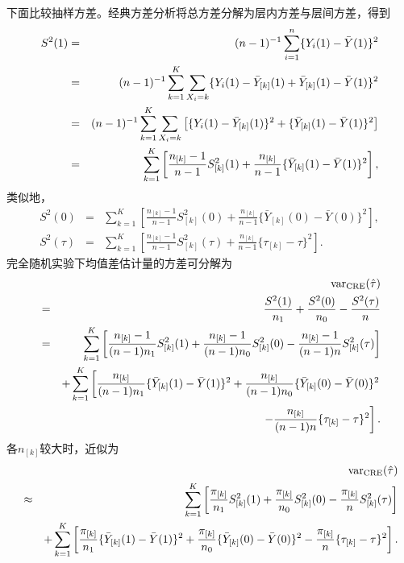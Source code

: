 下面比较抽样方差。经典方差分析将总方差分解为层内方差与层间方差，得到
\begin{eqnarray*}
S^2(1) &=&  (n-1)^{-1} \sum_{i=1}^n \{  Y_i(1) - \bar{Y}(1) \}^2 \\
&=& (n-1)^{-1} \sum_{k=1}^K \sum_{X_i   = k} \{ Y_i(1) - \bar{Y}_{[k]}(1)  + \bar{Y}_{[k]}(1)  -   \bar{Y}(1)  \}^2 \\
&=& (n-1)^{-1} \sum_{k=1}^K \sum_{X_i   = k} \left[  \{ Y_i(1) - \bar{Y}_{[k]}(1) \}^2 +  \{ \bar{Y}_{[k]}(1)  -   \bar{Y}(1)  \}^2 \right] \\
&=& \sum_{k=1}^K \left[   \frac{n_{[k]} - 1}{n-1}   S_{[k]}^2(1)  +  \frac{ n_{[k]}}{ n-1} \{ \bar{Y}_{[k]}(1) - \bar{Y}(1) \}^2  \right],
\end{eqnarray*}
类似地，
\begin{eqnarray*}
S^2(0) &=& \sum_{k=1}^K \left[   \frac{n_{[k]} - 1}{n-1}   S_{[k]}^2(0)  +  \frac{ n_{[k]}}{ n-1} \{ \bar{Y}_{[k]}(0) - \bar{Y}(0) \}^2  \right],\\
S^2(\tau) &=& \sum_{k=1}^K \left[   \frac{n_{[k]} - 1}{n-1}   S_{[k]}^2(\tau)  +  \frac{ n_{[k]}}{ n-1} \{ \tau_{[k]} - \tau \}^2  \right] .
\end{eqnarray*}
完全随机实验下均值差估计量的方差可分解为
\begin{eqnarray*}
&&\textup{var}_{\text{CRE}}(  \hat{\tau} )  \\
&=& \frac{S^2(1)}{ n_{1} } +  \frac{S^2(0)}{ n_{0} }
- \frac{  S^2(\tau) }{ n }  \\ 
&=& \sum_{k=1}^K  \left[   \frac{ n_{[k]} - 1}{(n-1)n_1}  S_{[k]}^2(1) + \frac{ n_{[k]} - 1}{ (n-1)n_0}  S_{[k]}^2(0) -  \frac{ n_{[k]} - 1}{(n-1)n}    S_{[k]}^2(\tau) \right] \\
&&  + \sum_{k=1}^K  \left[    \frac{ n_{[k]}}{ (n-1)n_1}  \{ \bar{Y}_{[k]}(1) - \bar{Y}(1) \}^2 +  \frac{ n_{[k]}}{ (n-1)n_0}  \{ \bar{Y}_{[k]}(0) - \bar{Y}(0) \}^2   \right. \\
&& \left.  - \frac{ n_{[k]} }{ (n-1)n} \{ \tau_{[k]} - \tau \}^2  \right] .
 \end{eqnarray*}
各$n_{[k]}$较大时，近似为
\begin{eqnarray*}
 &&\textup{var}_{\text{CRE}}(  \hat{\tau} )  \\
&\approx & 
\sum_{k=1}^K  \left[   \frac{ \pi_{[k]}}{n_1}  S_{[k]}^2(1) + \frac{ \pi_{[k]}}{n_0}  S_{[k]}^2(0) -  \frac{ \pi_{[k]}}{n}    S_{[k]}^2(\tau) \right] \\
&&  + \sum_{k=1}^K  \left[    \frac{ \pi_{[k]}}{n_1}  \{ \bar{Y}_{[k]}(1) - \bar{Y}(1) \}^2 +  \frac{ \pi_{[k]}}{n_0}  \{ \bar{Y}_{[k]}(0) - \bar{Y}(0) \}^2  
 - \frac{ \pi_{[k]}  }{n} \{ \tau_{[k]} - \tau \}^2  \right] .
\end{eqnarray*}
